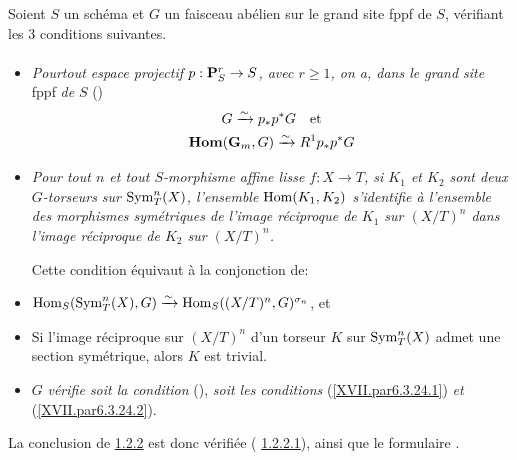\documentclass[10pt]{../fichiers-configuration-latex/smfart}
\begin{document}
\subsubsection{}
Soient $S$ un schéma et $G$ un faisceau abélien sur le grand site fppf
de $S$, vérifiant les 3 conditions suivantes.

\paragraph{}
\begin{itemize}
\item[(i)] \emph{Pour\pageoriginale tout espace projectif
$p:\mathbf{P}^r_{S}\rightarrow S$, avec $r\geq 1$, on a, dans le grand
site} fppf \emph{de} $S$ ()
\begin{gather*}
G\xrightarrow{\sim} p_{\ast}p^{\ast}G\quad\mbox{et}\\
\operatorname{\mathbf{Hom}}(\mathbf{G}_{m},G)\xrightarrow{\sim} R^{1}p_{\ast}p^{\ast}G
\end{gather*}
 
\item[(ii)] \emph{Pour tout $n$ et tout $S$-morphisme affine lisse
  $f:X\rightarrow 
T$, si $K_{1}$ et $K_{2}$ sont deux $G$-torseurs sur
$\operatorname{Sym}^{n}_{T}(X)$, l'ensemble $\operatorname{Hom}(K_{1},K_{2})$ s'identifie à
l'ensemble des morphismes symétriques de l'image réciproque de $K_{1}$
sur $(X/T)^{n}$ dans l'image réciproque de $K_{2}$ sur $(X/T)^{n}$.}

Cette condition équivaut à la conjonction de:

\item[${\rm (ii')}$]
$\operatorname{Hom}_{S}(\operatorname{Sym}^{n}_{T}(X),G)\xrightarrow{\sim}\operatorname{Hom}_{S}((X/T)^{n},
G)^{\sigma_n}$, et

\item[${\rm (ii'')}$] Si l'image réciproque sur $(X/T)^{n}$ d'un
torseur $K$ sur $\operatorname{Sym}^{n}_{T}(X)$ admet une section symétrique, alors
$K$ est trivial.

\item[(iii)] $G$ \emph{vérifie soit la condition} (),
\emph{soit les conditions} (\ref{XVII.par6.3.24.1}) \emph{et} (\ref{XVII.par6.3.24.2}).
\end{itemize}

La conclusion de \hyperref[XVIII.thm1.2.2]{1.2.2} est donc vérifiée (\cf
\hyperref[XVIII.par1.2.2.1]{1.2.2.1}), ainsi que le formulaire .
\end{document}
